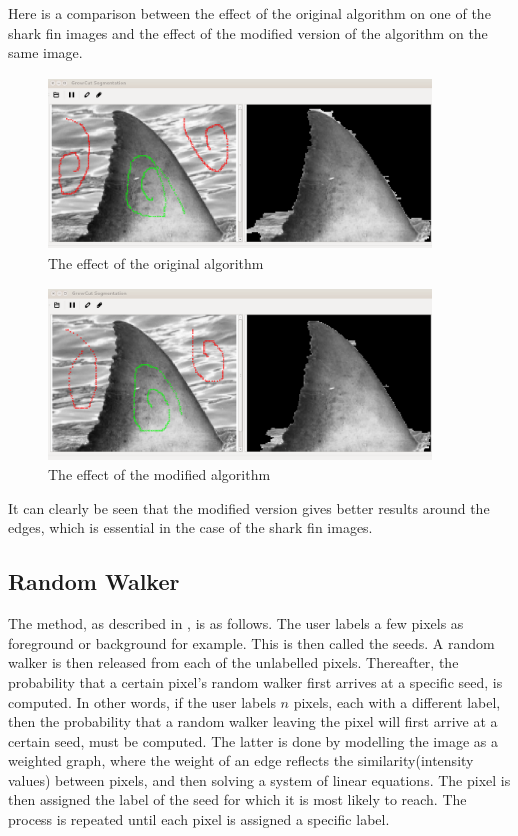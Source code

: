 \documentclass[a4paper,10pt]{article}
\begin{document}
\newpage
\noindent Here is a comparison between the effect of the original algorithm on one of the shark fin images and the effect of the modified version of the algorithm on the same image.
\begin{figure}[H]
 \centering
 \includegraphics[width=4in, height=1.8in]{haaio}
 \caption{The effect of the original algorithm}
 \label{fin1}
\end{figure}

\begin{figure}[H]
 \centering
 \includegraphics[width=4in, height=1.8in]{haaim}
 \caption{The effect of the modified algorithm}
 \label{fin}
\end{figure}

\noindent It can clearly be seen that the modified version gives better results around the edges, which is essential in the case of the shark fin images.  

\subsection{Random Walker}
The method, as
described in \cite{rw}, is as follows.  The user labels a few
pixels as foreground or background for example.  This is then called the seeds. 
A random walker is then released from each of the unlabelled pixels. 
Thereafter, the probability that a certain pixel's random walker first arrives
at a specific seed, is computed.  In other words, if the user labels $n$
pixels, each with a different label, then the probability that a random walker
leaving the pixel will first arrive at a certain seed, must be
computed.  The latter is done by modelling the image as a weighted graph, where
the weight of an edge reflects the similarity(intensity values) between pixels,
and then solving a system of linear equations.  The pixel is then assigned the label
of the seed for which it is most likely to reach.  The process is repeated until
each pixel is assigned a specific label. 
\end{document}
